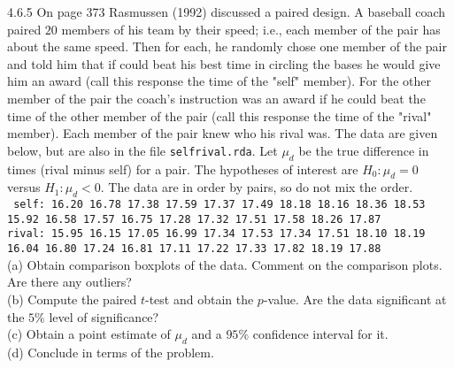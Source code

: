 \begin{exercise}{4.6.5}{}
    On page 373 Rasmussen (1992) discussed a paired design. A baseball coach 
    paired $20$ members of his team by their speed; i.e., each member of the pair has 
    about the same speed. Then for each, he randomly chose one member of the
    pair and told him that if could beat his best time in circling the bases he would
    give him an award (call this response the time of the "self" member). For the other
    member of the pair the coach's instruction was an award if he could beat the time 
    of the other member of the pair (call this response the time of the "rival" member). 
    Each member of the pair knew who his rival was. The data are given below, but are
    also in the file {\tt selfrival.rda}. Let $\mu_d$ be the true difference in times (rival minus 
    self) for a pair. The hypotheses of interest are $H_0:\mu_d=0$ versus $H_1:\mu_d<0$. The
    data are in order by pairs, so do not mix the order.\\
    {\tt 
    \quad self: 16.20 16.78 17.38 17.59 17.37 17.49 18.18 18.16 18.36 18.53 
    15.92 16.58 17.57 16.75 17.28 17.32 17.51 17.58 18.26 17.87\\
    \quad rival: 15.95 16.15 17.05 16.99 17.34 17.53 17.34 17.51 18.10 18.19
    16.04 16.80 17.24 16.81 17.11 17.22 17.33 17.82 18.19 17.88} \\
    (a) Obtain comparison boxplots of the data. Comment on the comparison plots.
    Are there any outliers?\\
    (b) Compute the paired $t$-test and obtain the $p$-value. Are the data significant at the 
    $5\%$ level of significance?\\
    (c) Obtain a point estimate of $\mu_d$ and a $95\%$ confidence interval for it.\\
    (d) Conclude in terms of the problem. 

\end{exercise}




